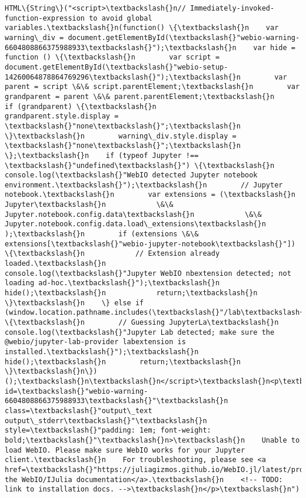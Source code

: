 \documentclass[11pt]{article}
\begin{document}
    
    \begin{Verbatim}[commandchars=\\\{\}]
HTML\{String\}("<script>\textbackslash{}n// Immediately-invoked-function-expression to avoid global variables.\textbackslash{}n(function() \{\textbackslash{}n    var warning\_div = document.getElementById(\textbackslash{}"webio-warning-6604808866375988933\textbackslash{}");\textbackslash{}n    var hide = function () \{\textbackslash{}n        var script = document.getElementById(\textbackslash{}"webio-setup-14260064878864769296\textbackslash{}");\textbackslash{}n        var parent = script \&\& script.parentElement;\textbackslash{}n        var grandparent = parent \&\& parent.parentElement;\textbackslash{}n        if (grandparent) \{\textbackslash{}n            grandparent.style.display = \textbackslash{}"none\textbackslash{}";\textbackslash{}n        \}\textbackslash{}n        warning\_div.style.display = \textbackslash{}"none\textbackslash{}";\textbackslash{}n    \};\textbackslash{}n    if (typeof Jupyter !== \textbackslash{}"undefined\textbackslash{}") \{\textbackslash{}n        console.log(\textbackslash{}"WebIO detected Jupyter notebook environment.\textbackslash{}");\textbackslash{}n        // Jupyter notebook.\textbackslash{}n        var extensions = (\textbackslash{}n            Jupyter\textbackslash{}n            \&\& Jupyter.notebook.config.data\textbackslash{}n            \&\& Jupyter.notebook.config.data.load\_extensions\textbackslash{}n        );\textbackslash{}n        if (extensions \&\& extensions[\textbackslash{}"webio-jupyter-notebook\textbackslash{}"]) \{\textbackslash{}n            // Extension already loaded.\textbackslash{}n            console.log(\textbackslash{}"Jupyter WebIO nbextension detected; not loading ad-hoc.\textbackslash{}");\textbackslash{}n            hide();\textbackslash{}n            return;\textbackslash{}n        \}\textbackslash{}n    \} else if (window.location.pathname.includes(\textbackslash{}"/lab\textbackslash{}")) \{\textbackslash{}n        // Guessing JupyterLa\textbackslash{}n        console.log(\textbackslash{}"Jupyter Lab detected; make sure the @webio/jupyter-lab-provider labextension is installed.\textbackslash{}");\textbackslash{}n        hide();\textbackslash{}n        return;\textbackslash{}n    \}\textbackslash{}n\})();\textbackslash{}n\textbackslash{}n</script>\textbackslash{}n<p\textbackslash{}n    id=\textbackslash{}"webio-warning-6604808866375988933\textbackslash{}"\textbackslash{}n    class=\textbackslash{}"output\_text output\_stderr\textbackslash{}"\textbackslash{}n    style=\textbackslash{}"padding: 1em; font-weight: bold;\textbackslash{}"\textbackslash{}n>\textbackslash{}n    Unable to load WebIO. Please make sure WebIO works for your Jupyter client.\textbackslash{}n    For troubleshooting, please see <a href=\textbackslash{}"https://juliagizmos.github.io/WebIO.jl/latest/providers/ijulia/\textbackslash{}">\textbackslash{}n    the WebIO/IJulia documentation</a>.\textbackslash{}n    <!-- TODO: link to installation docs. -->\textbackslash{}n</p>\textbackslash{}n")
    \end{Verbatim}
\end{document}
